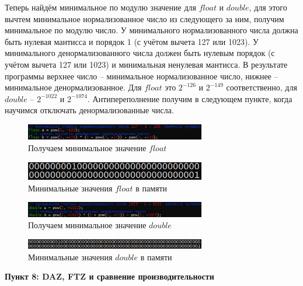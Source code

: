 \documentclass[a4paper,12pt]{article}
\begin{document}
Теперь найдём минимальное по модулю значение для $float$ и $double$, для этого вычтем минимальное нормализованное число из следующего за ним, получим минимальное по модулю число. У минимального нормализованного числа должна быть нулевая мантисса и порядок 1 (с учётом вычета 127 или 1023). У минимального денормализованного числа должен быть нулевым порядок (с учётом вычета 127 или 1023) и минимальная ненулевая мантисса. В результате программы верхнее число -- минимальное нормализованное число, нижнее -- минимальное денормализованное. Для $float$ это $2^{-126}$ и $2^{-149}$ соответственно, для $double$ -- $2^{-1022}$ и $2^{-1074}$. Антипереполнение получим в следующем пункте, когда научимся отключать денормализованные числа.
\begin{figure}[H]\label{fig: minimum float code}
    \centering
    \includegraphics[width=0.7\textwidth]{Минимальный float вставка.png}
    \caption{Получаем минимальное значение $float$}
\end{figure}
\begin{figure}[H]\label{fig: minimum float result}
    \centering
    \includegraphics[width=0.7\textwidth]{Минимальный float результат.png}
    \caption{Минимальные значения $float$ в памяти}
\end{figure}

\begin{figure}[H]\label{fig: minimum double code}
    \centering
    \includegraphics[width=0.7\textwidth]{Минимальный double вставка.png}
    \caption{Получаем минимальное значение $double$}
\end{figure}
\begin{figure}[H]\label{fig: minimum double result}
    \centering
    \includegraphics[width=0.7\textwidth]{Минимальный double результат.png}
    \caption{Минимальные значения $double$ в памяти}
\end{figure}

\textbf{Пункт 8: DAZ, FTZ и сравнение производительности}
\end{document}
